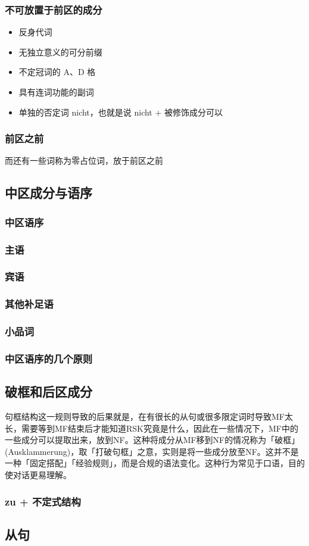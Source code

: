 \subsubsection{不可放置于前区的成分}
\begin{itemize}
    \item 反身代词
    \item 无独立意义的可分前缀
    \item 不定冠词的 A、D 格
    \item 具有连词功能的副词
    \item 单独的否定词 nicht，也就是说 nicht + 被修饰成分可以
\end{itemize}

\subsubsection{前区之前}
而还有一些词称为零占位词，放于前区之前

\subsection{中区成分与语序}

\subsubsection{中区语序}
\subsubsection{主语}
\subsubsection{宾语}
\subsubsection{其他补足语}
\subsubsection{小品词}
\subsubsection{中区语序的几个原则}


\subsection{破框和后区成分}


句框结构这一规则导致的后果就是，在有很长的从句或很多限定词时导致MF太长，需要等到MF结束后才能知道RSK究竟是什么，因此在一些情况下，MF中的一些成分可以提取出来，放到NF。这种将成分从MF移到NF的情况称为「破框」(Ausklammerung)，取「打破句框」之意，实则是将一些成分放至NF。这并不是一种「固定搭配」「经验规则」，而是合规的语法变化。这种行为常见于口语，目的使对话更易理解。

\subsubsection{zu + 不定式结构}
\subsubsection{}
\subsection{从句}
